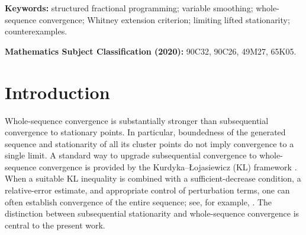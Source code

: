 \documentclass[11pt]{article}
\numberwithin{equation}{section}
\begin{document}
\begin{abstract}
We study  whole-sequence convergence of the smoothing-based
full-splitting proximal subgradient method (S-FSPS) for structured nonconvex
and nonsmooth fractional programs, introduced  by
Bo\c{t}, Li, and Tao (SIAM J. Optim., 35(4):2623--2653, 2025) as Algorithm~4.1. Existing theory
guarantees only the existence of a subsequence converging to a
limiting lifted stationary point. We show that this guarantee is sharp by constructing two admissible
instances whose corresponding primal sequences both have cluster set
$\{1\}\times\mathbb S^1$ and infinite length, although every cluster
point is a limiting lifted stationary point.  The construction prescribes a slowly rotating spiral and
realizes it exactly through a compatible first-order jet and a
$C^{1,1}$ Whitney extension. In the first instance, $A$ has rank one
and every smoothing-dual iterate is nonzero. In the second, the
feasible set is full-dimensional, $A$ has full row rank, and each of
$f\circ K$, $g\circ A$, and the numerator $g\circ A+h$ is
nonconstant on the feasible set. The first instance also yields a nonconvergent example for the
corresponding variable-smoothing, single-loop, full-splitting method
for nonconvex and nonsmooth composite optimization, although that
method still admits a subsequence converging to an exact stationary
point. Thus, a vanishing but
nonsummable smoothing schedule does not imply whole-sequence
convergence.
\end{abstract}
{\bf Keywords:} structured fractional programming; variable smoothing; whole-sequence convergence;
 Whitney extension criterion; limiting lifted stationarity; counterexamples.
\vspace{0.2cm}

\textbf{Mathematics Subject Classification (2020):}
90C32, 90C26, 49M27, 65K05.




\section{Introduction}\label{sec:introduction}


Whole-sequence convergence is substantially stronger than subsequential
convergence to stationary points. In particular, boundedness of the generated
sequence and stationarity of all its cluster points do not imply convergence
to a single limit. A standard way to upgrade subsequential
convergence to whole-sequence convergence is provided by the
Kurdyka--\L ojasiewicz (KL) framework \cite{AB,ABS,Sun1}. When a suitable KL
inequality is combined with a sufficient-decrease condition, a relative-error
estimate, and appropriate control of perturbation terms, one can often
establish convergence of the entire sequence; see, for example,
\cite{AB,ABS,Sun1}. The distinction between subsequential stationarity and
whole-sequence convergence is central to the present work.
\end{document}
